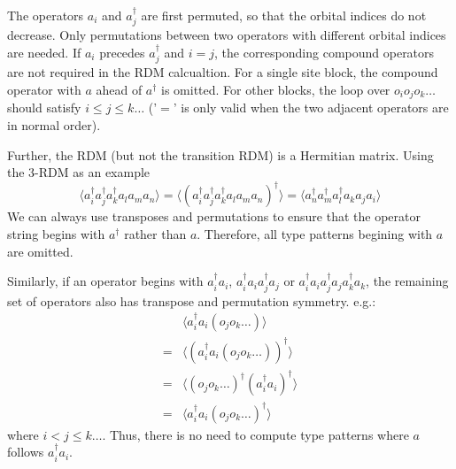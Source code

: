 The operators $a_i$ and $a^\dagger_j$ are first permuted, so that the orbital indices do not decrease. Only permutations between two operators with different orbital indices are needed.
If $a_i$ precedes $a^\dagger_j$ and $i=j$, the corresponding compound operators are not required in the RDM calcualtion.
For a single site block, the compound operator with $a$ ahead of $a^\dagger$ is omitted. For other blocks, the loop over $o_io_jo_k\dots$ should satisfy $i \le j \le k\dots$ ('$=$' is only valid when the two adjacent operators are in normal order). 

Further, the RDM (but not the transition RDM) is a Hermitian matrix. Using the 3-RDM as an example 
\begin{equation}
  \langle a_i^\dagger a_j^\dagger a^\dagger_k a_l a_m a_n\rangle = \langle(a_i^\dagger a_j^\dagger a^\dagger_k a_l a_m a_n)^\dagger\rangle
  = \langle a_n^\dagger a_m^\dagger a_l^\dagger a_k a_j a_i\rangle
\end{equation}
We can always use transposes and permutations to ensure that the operator string begins with $a^\dagger$ rather than $a$.
Therefore, all type patterns begining with $a$ are omitted. 

Similarly, if an operator begins with $a^\dagger_ia_i$, $a^\dagger_ia_ia^\dagger_ja_j$ or $a^\dagger_ia_ia^\dagger_ja_ja^\dagger_ka_k$, the remaining set of operators also has transpose and permutation symmetry. e.g.:
\begin{equation}
\begin{aligned}
  &\langle a^\dagger_ia_i(o_j o_k\dots)\rangle \\
  = &\langle(a^\dagger_ia_i (o_j o_k\dots))^\dagger\rangle \\
  = &\langle(o_j o_k\dots)^\dagger(a^\dagger_ia_i)^\dagger\rangle \\
  = &\langle a^\dagger_ia_i(o_j o_k\dots)^\dagger\rangle
\end{aligned}
\end{equation}
where $i < j\le k\dots$.
Thus, there is no need to compute type patterns where $a$ follows $a^\dagger_ia_i$.

